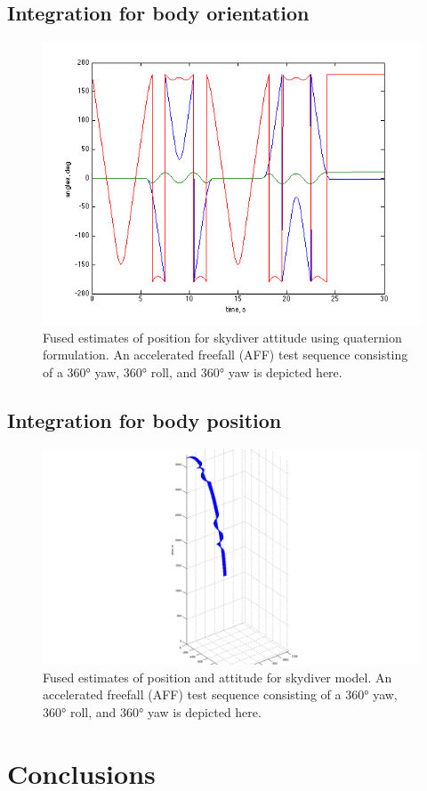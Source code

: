 \documentclass{amsart}
\begin{document}
\subsection{Integration for body orientation}
\begin{figure}
\includegraphics[width=\textwidth]{figures/skydiver-angles.png}
\caption{Fused estimates of position for skydiver attitude using quaternion formulation. An accelerated freefall (AFF) test sequence consisting of a \ang{360} yaw, \ang{360} roll, and \ang{360} yaw is depicted here.}
\label{fig:skydiver-angle}
\end{figure}

\subsection{Integration for body position}
\begin{figure}
\includegraphics[width=\textwidth]{figures/skydiver-heading.png}
\caption{Fused estimates of position and attitude for skydiver model. An accelerated freefall (AFF) test sequence consisting of a \ang{360} yaw, \ang{360} roll, and \ang{360} yaw is depicted here.}
\label{fig:skydiver-position}
\end{figure}

\section{Conclusions}



\end{document}
